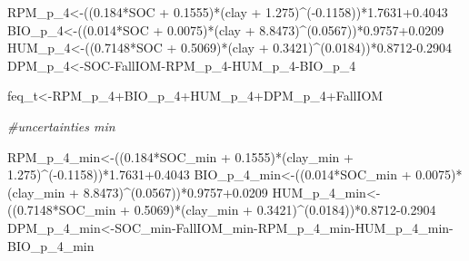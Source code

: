 \documentclass[
  10pt,
  b5paper,
]{book}
\newenvironment{Shaded}{\begin{snugshade}}{\end{snugshade}}
\newcommand{\CommentTok}[1]{\textcolor[rgb]{0.56,0.35,0.01}{\textit{#1}}}
\newcommand{\FloatTok}[1]{\textcolor[rgb]{0.00,0.00,0.81}{#1}}
\newcommand{\NormalTok}[1]{#1}
\newcommand{\OtherTok}[1]{\textcolor[rgb]{0.56,0.35,0.01}{#1}}
\newcommand{\SpecialCharTok}[1]{\textcolor[rgb]{0.00,0.00,0.00}{#1}}
\begin{document}
\begin{Shaded}
\begin{Highlighting}[]
\NormalTok{RPM\_p\_4}\OtherTok{\textless{}{-}}\NormalTok{((}\FloatTok{0.184}\SpecialCharTok{*}\NormalTok{SOC }\SpecialCharTok{+} \FloatTok{0.1555}\NormalTok{)}\SpecialCharTok{*}\NormalTok{(clay }\SpecialCharTok{+} \FloatTok{1.275}\NormalTok{)}\SpecialCharTok{\^{}}\NormalTok{(}\SpecialCharTok{{-}}\FloatTok{0.1158}\NormalTok{))}\SpecialCharTok{*}\FloatTok{1.7631+0.4043}
\NormalTok{BIO\_p\_4}\OtherTok{\textless{}{-}}\NormalTok{((}\FloatTok{0.014}\SpecialCharTok{*}\NormalTok{SOC }\SpecialCharTok{+} \FloatTok{0.0075}\NormalTok{)}\SpecialCharTok{*}\NormalTok{(clay }\SpecialCharTok{+} \FloatTok{8.8473}\NormalTok{)}\SpecialCharTok{\^{}}\NormalTok{(}\FloatTok{0.0567}\NormalTok{))}\SpecialCharTok{*}\FloatTok{0.9757+0.0209}
\NormalTok{HUM\_p\_4}\OtherTok{\textless{}{-}}\NormalTok{((}\FloatTok{0.7148}\SpecialCharTok{*}\NormalTok{SOC }\SpecialCharTok{+} \FloatTok{0.5069}\NormalTok{)}\SpecialCharTok{*}\NormalTok{(clay }\SpecialCharTok{+} \FloatTok{0.3421}\NormalTok{)}\SpecialCharTok{\^{}}\NormalTok{(}\FloatTok{0.0184}\NormalTok{))}\SpecialCharTok{*}\FloatTok{0.8712{-}0.2904}
\NormalTok{DPM\_p\_4}\OtherTok{\textless{}{-}}\NormalTok{SOC}\SpecialCharTok{{-}}\NormalTok{FallIOM}\SpecialCharTok{{-}}\NormalTok{RPM\_p\_4}\SpecialCharTok{{-}}\NormalTok{HUM\_p\_4}\SpecialCharTok{{-}}\NormalTok{BIO\_p\_4}

\NormalTok{feq\_t}\OtherTok{\textless{}{-}}\NormalTok{RPM\_p\_4}\SpecialCharTok{+}\NormalTok{BIO\_p\_4}\SpecialCharTok{+}\NormalTok{HUM\_p\_4}\SpecialCharTok{+}\NormalTok{DPM\_p\_4}\SpecialCharTok{+}\NormalTok{FallIOM}

\CommentTok{\#uncertainties min}

\NormalTok{RPM\_p\_4\_min}\OtherTok{\textless{}{-}}\NormalTok{((}\FloatTok{0.184}\SpecialCharTok{*}\NormalTok{SOC\_min }\SpecialCharTok{+} \FloatTok{0.1555}\NormalTok{)}\SpecialCharTok{*}\NormalTok{(clay\_min }\SpecialCharTok{+} \FloatTok{1.275}\NormalTok{)}\SpecialCharTok{\^{}}\NormalTok{(}\SpecialCharTok{{-}}\FloatTok{0.1158}\NormalTok{))}\SpecialCharTok{*}\FloatTok{1.7631+0.4043}
\NormalTok{BIO\_p\_4\_min}\OtherTok{\textless{}{-}}\NormalTok{((}\FloatTok{0.014}\SpecialCharTok{*}\NormalTok{SOC\_min }\SpecialCharTok{+} \FloatTok{0.0075}\NormalTok{)}\SpecialCharTok{*}\NormalTok{(clay\_min }\SpecialCharTok{+} \FloatTok{8.8473}\NormalTok{)}\SpecialCharTok{\^{}}\NormalTok{(}\FloatTok{0.0567}\NormalTok{))}\SpecialCharTok{*}\FloatTok{0.9757+0.0209}
\NormalTok{HUM\_p\_4\_min}\OtherTok{\textless{}{-}}\NormalTok{((}\FloatTok{0.7148}\SpecialCharTok{*}\NormalTok{SOC\_min }\SpecialCharTok{+} \FloatTok{0.5069}\NormalTok{)}\SpecialCharTok{*}\NormalTok{(clay\_min }\SpecialCharTok{+} \FloatTok{0.3421}\NormalTok{)}\SpecialCharTok{\^{}}\NormalTok{(}\FloatTok{0.0184}\NormalTok{))}\SpecialCharTok{*}\FloatTok{0.8712{-}0.2904}
\NormalTok{DPM\_p\_4\_min}\OtherTok{\textless{}{-}}\NormalTok{SOC\_min}\SpecialCharTok{{-}}\NormalTok{FallIOM\_min}\SpecialCharTok{{-}}\NormalTok{RPM\_p\_4\_min}\SpecialCharTok{{-}}\NormalTok{HUM\_p\_4\_min}\SpecialCharTok{{-}}\NormalTok{BIO\_p\_4\_min}


\end{Highlighting}
\end{Shaded}
\end{document}
